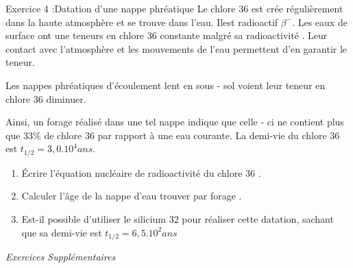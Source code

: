\documentclass[12pt, french]{article}
\begin{document}
\begin{Box2}{Exercice 4 :Datation d’une nappe phréatique }
Le chlore 36 est crée régulièrement dans la haute atmosphère et se trouve dans l’eau. Ilest radioactif $\beta^-$. Les eaux de surface ont une teneurs en chlore 36 constante malgré sa
radioactivité . Leur contact avec l’atmosphère et les mouvements de l’eau permettent d’en garantir le teneur. 

Les nappes phréatiques d’écoulement lent en sous - sol voient leur teneur en chlore 36 diminuer. 

Ainsi, un forage réalisé dans une tel nappe indique que celle - ci ne
contient plus que $33\%$ de chlore 36 par rapport à une eau courante. La demi-vie du chlore
36 est $t_{1/2} = 3, 0. 10^4ans$.

\begin{enumerate}
	\item Écrire l’équation nucléaire de radioactivité du chlore 36 .

	\item Calculer l’âge de la nappe d’eau trouver par forage .
	\item  Est-il possible d’utiliser le silicium 32 pour réaliser cette datation, sachant que sa
		demi-vie est $t_{1/2} = 6,5.10^2ans$
\end{enumerate}

\end{Box2}
\begin{center}
   \Large{ \em{Exercices Supplémentaires}}
\end{center}
\end{document}
